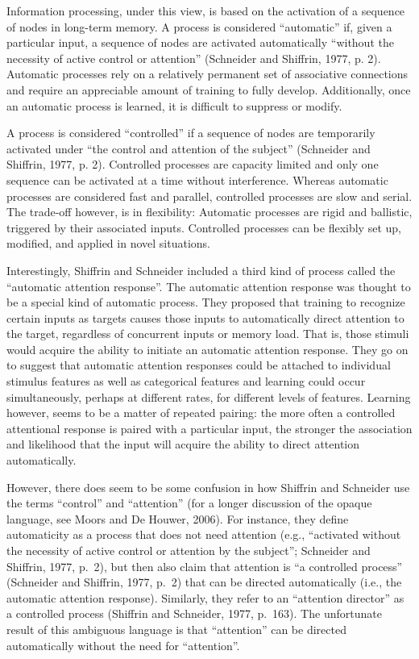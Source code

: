 \documentclass[]{DissertateCUNY}
\begin{document}
Information processing, under this view, is based on the activation of a
sequence of nodes in long-term memory. A process is considered
``automatic'' if, given a particular input, a sequence of nodes are
activated automatically ``without the necessity of active control or
attention'' (Schneider and Shiffrin, 1977, p. 2). Automatic processes
rely on a relatively permanent set of associative connections and
require an appreciable amount of training to fully develop.
Additionally, once an automatic process is learned, it is difficult to
suppress or modify.

A process is considered ``controlled'' if a sequence of nodes are
temporarily activated under ``the control and attention of the subject''
(Schneider and Shiffrin, 1977, p. 2). Controlled processes are capacity
limited and only one sequence can be activated at a time without
interference. Whereas automatic processes are considered fast and
parallel, controlled processes are slow and serial. The trade-off
however, is in flexibility: Automatic processes are rigid and ballistic,
triggered by their associated inputs. Controlled processes can be
flexibly set up, modified, and applied in novel situations.

Interestingly, Shiffrin and Schneider included a third kind of process
called the ``automatic attention response''. The automatic attention
response was thought to be a special kind of automatic process. They
proposed that training to recognize certain inputs as targets causes
those inputs to automatically direct attention to the target, regardless
of concurrent inputs or memory load. That is, those stimuli would
acquire the ability to initiate an automatic attention response. They go
on to suggest that automatic attention responses could be attached to
individual stimulus features as well as categorical features and
learning could occur simultaneously, perhaps at different rates, for
different levels of features. Learning however, seems to be a matter of
repeated pairing: the more often a controlled attentional response is
paired with a particular input, the stronger the association and
likelihood that the input will acquire the ability to direct attention
automatically.

However, there does seem to be some confusion in how Shiffrin and
Schneider use the terms ``control'' and ``attention'' (for a longer
discussion of the opaque language, see Moors and De Houwer, 2006). For
instance, they define automaticity as a process that does not need
attention (e.g., ``activated without the necessity of active control or
attention by the subject''; Schneider and Shiffrin, 1977, p.~2), but
then also claim that attention is ``a controlled process'' (Schneider
and Shiffrin, 1977, p.~2) that can be directed automatically (i.e., the
automatic attention response). Similarly, they refer to an ``attention
director'' as a controlled process (Shiffrin and Schneider, 1977,
p.~163). The unfortunate result of this ambiguous language is that
``attention'' can be directed automatically without the need for
``attention''.
\end{document}
